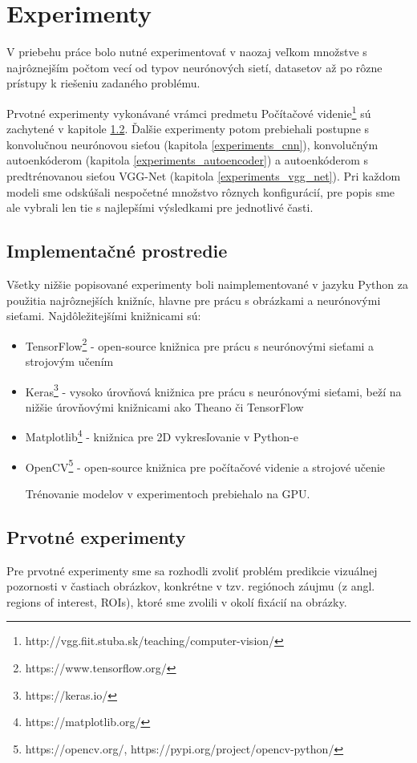\newpage
\null
\thispagestyle{empty}
\newpage
\section{Experimenty}
\label{experiments}
V priebehu práce bolo nutné experimentovať v naozaj veľkom množstve s najrôznejším počtom vecí od typov neurónových sietí, datasetov až po rôzne prístupy k riešeniu zadaného problému.

Prvotné experimenty vykonávané vrámci predmetu Počítačové videnie\footnote{http://vgg.fiit.stuba.sk/teaching/computer-vision/} sú zachytené v kapitole \ref{first_experiments}. Ďalšie experimenty potom prebiehali postupne s konvolučnou neurónovou sieťou (kapitola \ref{experiments_cnn}), konvolučným autoenkóderom (kapitola \ref{experiments_autoencoder}) a autoenkóderom s predtrénovanou sieťou VGG-Net (kapitola \ref{experiments_vgg_net}). Pri každom modeli sme odskúšali nespočetné množstvo rôznych konfigurácií, pre popis sme ale vybrali len tie s najlepšími výsledkami pre jednotlivé časti. 

\subsection{Implementačné prostredie}

Všetky nižšie popisované experimenty boli naimplementované v jazyku Python za použitia najrôznejších knižníc, hlavne pre prácu s obrázkami a neurónovými sieťami. Najdôležitejšími knižnicami sú:
\begin{itemize}
	\item TensorFlow\footnote{https://www.tensorflow.org/} - open-source knižnica pre prácu s neurónovými sieťami a strojovým učením
	\item Keras\footnote{https://keras.io/} - vysoko úrovňová knižnica pre prácu s neurónovými sieťami, beží na nižšie úrovňovými knižnicami ako Theano či TensorFlow
	\item Matplotlib\footnote{https://matplotlib.org/} - knižnica pre 2D vykresľovanie v Python-e
	\item OpenCV\footnote{https://opencv.org/, https://pypi.org/project/opencv-python/} - open-source knižnica pre počítačové videnie a strojové učenie
	
	Trénovanie modelov v experimentoch prebiehalo na GPU.
\end{itemize}

\subsection{Prvotné experimenty}
\label{first_experiments}
Pre prvotné experimenty sme sa rozhodli zvoliť problém predikcie vizuálnej pozornosti v častiach obrázkov, konkrétne v tzv. regiónoch záujmu (z angl. regions of interest, ROIs), ktoré sme zvolili v okolí fixácií na obrázky.

